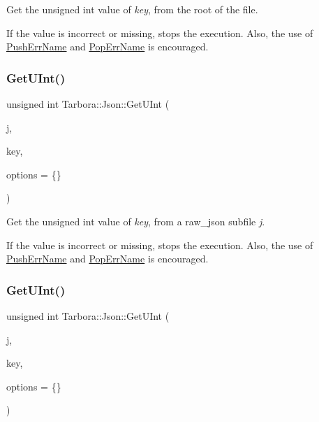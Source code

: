 Get the unsigned int value of {\itshape key}, from the root of the file. 

If the value is incorrect or missing, stops the execution. Also, the use of \hyperlink{classTarbora_1_1Json_a061eac4f16dac3b9b3a26a66de0ea8f0}{Push\+Err\+Name} and \hyperlink{classTarbora_1_1Json_a14019f06d3bd76edd6a6e78134519d11}{Pop\+Err\+Name} is encouraged. \mbox{\label{classTarbora_1_1Json_a7a4f2fd643369df0750e951db42499e3}} 
\subsubsection{\texorpdfstring{Get\+U\+Int()}{GetUInt()}\hspace{0.1cm}{\footnotesize\ttfamily [2/3]}}
{\footnotesize\ttfamily unsigned int Tarbora\+::\+Json\+::\+Get\+U\+Int (\begin{DoxyParamCaption}\item[{raw\+\_\+json}]{j,  }\item[{const char $\ast$}]{key,  }\item[{\hyperlink{structTarbora_1_1JsonOptions}{Json\+Options}}]{options = {\ttfamily \{\}} }\end{DoxyParamCaption})}



Get the unsigned int value of {\itshape key}, from a raw\+\_\+json subfile {\itshape j}. 

If the value is incorrect or missing, stops the execution. Also, the use of \hyperlink{classTarbora_1_1Json_a061eac4f16dac3b9b3a26a66de0ea8f0}{Push\+Err\+Name} and \hyperlink{classTarbora_1_1Json_a14019f06d3bd76edd6a6e78134519d11}{Pop\+Err\+Name} is encouraged. \mbox{\label{classTarbora_1_1Json_a3bf386f07b8648fb7d55b22712df5cb3}} 
\subsubsection{\texorpdfstring{Get\+U\+Int()}{GetUInt()}\hspace{0.1cm}{\footnotesize\ttfamily [3/3]}}
{\footnotesize\ttfamily unsigned int Tarbora\+::\+Json\+::\+Get\+U\+Int (\begin{DoxyParamCaption}\item[{raw\+\_\+json}]{j,  }\item[{int}]{key,  }\item[{\hyperlink{structTarbora_1_1JsonOptions}{Json\+Options}}]{options = {\ttfamily \{\}} }\end{DoxyParamCaption})}

